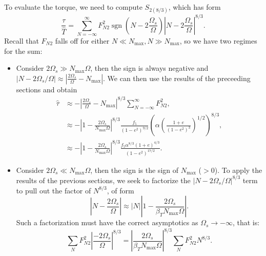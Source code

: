 \documentclass[
        fleqn,
        usenatbib,
        referee,
    ]{mnras}
\newcommand*{\abs}[1]{\left|#1\right|}
\newcommand*{\p}[1]{\left(#1\right)}
\DeclareMathOperator*{\sgn}{sgn}
\begin{document}
To evaluate the torque, we need to compute $S_{2(8/3)}$, which has form
\begin{equation}
    \frac{\tau}{\hat{T}} = \sum\limits_{N = -\infty}^\infty
        F_{N2}^2 \sgn\p{N - 2\frac{\Omega_s}{\Omega}}
            \abs{N - 2\frac{\Omega_s}{\Omega}}^{8/3}.
\end{equation}
Recall that $F_{N2}$ falls off for either $N \ll N_{\max}, N \gg N_{\max}$, so
we have two regimes for the sum:
\begin{itemize}
    \item Consider $2\Omega_s \gg N_{\max}\Omega$, then the sign is always
        negative and $\abs{N - 2\Omega_s/\Omega} \approx
        \abs{\frac{2\Omega_s}{\Omega} - N_{\max}}$. We can then use the results
        of the preceeding sections and obtain
        \begin{align}
            \hat{\tau}
                &\approx -\abs{\frac{2\Omega_s}{\Omega} - N_{\max}}^{8/3}
                    \sum\limits_{N = -\infty}^\infty F_{N2}^2,\\
                &\approx -\abs{1 - \frac{2\Omega_s}{N_{\max}\Omega}}^{8/3}
                    \frac{f_5}{\p{1 - e^2}^{9/2}}\p{\alpha\p{\frac{1 + e}{\p{1 -
                    e^2}^3}}^{1/2}}^{8/3},\\
                &\approx -\abs{1 - \frac{2\Omega_s}{N_{\max}\Omega}}^{8/3}
                    \frac{f_5\alpha^{8/3}\p{1 + e}^{4/3}}{\p{1 - e^2}^{17/2}}.
        \end{align}

    \item Consider $2\Omega_s \ll N_{\max} \Omega$, then the sign is the
        sign of $N_{\max}$ ($>0$). To apply the results of the previous
        sections, we seek to factorize the $\abs{N - 2\Omega_s/\Omega}^{8/3}$
        term to pull out the factor of $N^{8/3}$, of form
        \begin{equation}
            \abs{N - \frac{2\Omega_s}{\Omega}} \approx \abs{N}\abs{1 -
                \frac{2\Omega_s}{\beta_T N_{\max}\Omega}}.
        \end{equation}
        Such a factorization must have the correct asymptotics as $\Omega_s \to
        -\infty$, that is:
        \begin{equation}
            \sum\limits_{N} F_{N2}^2 \abs{\frac{-2\Omega_s}{\Omega}}^{8/3}
                = \abs{\frac{2\Omega_s}{\beta_T N_{\max}\Omega}}^{8/3}
                    \sum\limits_{N}F_{N2}^2 N^{8/3}.
        \end{equation}


\end{itemize}
\end{document}
